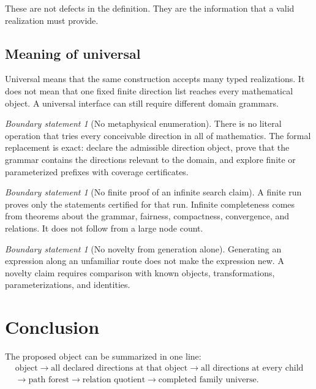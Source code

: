 \documentclass[11pt,openany]{report}
\theoremstyle{definition}
\theoremstyle{remark}
\newtheorem{boundary}[theorem]{Boundary statement}
\begin{document}
These are not defects in the definition. They are the information that a valid realization must provide.

\section{Meaning of universal}

Universal means that the same construction accepts many typed realizations. It does not mean that one fixed finite direction list reaches every mathematical object. A universal interface can still require different domain grammars.

\begin{boundary}[No metaphysical enumeration]
There is no literal operation that tries every conceivable direction in all of mathematics. The formal replacement is exact: declare the admissible direction object, prove that the grammar contains the directions relevant to the domain, and explore finite or parameterized prefixes with coverage certificates.
\end{boundary}

\begin{boundary}[No finite proof of an infinite search claim]
A finite run proves only the statements certified for that run. Infinite completeness comes from theorems about the grammar, fairness, compactness, convergence, and relations. It does not follow from a large node count.
\end{boundary}

\begin{boundary}[No novelty from generation alone]
Generating an expression along an unfamiliar route does not make the expression new. A novelty claim requires comparison with known objects, transformations, parameterizations, and identities.
\end{boundary}

\chapter{Conclusion}

The proposed object can be summarized in one line:
\[
\boxed{
\begin{gathered}
\text{object}
\longrightarrow
\text{all declared directions at that object}
\longrightarrow
\text{all directions at every child}
\\[0.25em]
\longrightarrow
\text{path forest}
\longrightarrow
\text{relation quotient}
\longrightarrow
\text{completed family universe}.
\end{gathered}
}
\]
\end{document}
